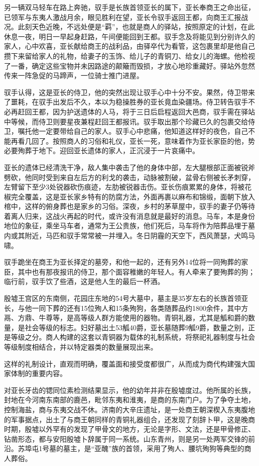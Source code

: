 另一辆双马轻车在路上奔驰，驭手是长族首领亚长的属下，亚长奉商王之命出征，已领军与东夷人激战月余，眼见胜利在望，亚长令驭手返回王都，向商王汇报战况。此刻天色近晚，不远处便是“羁”，也就是商人的驿站，按照原定的计划，在此休息一夜，明日一早起身赶路，午间便能回到王都。驭手念及将能见到分别许久的家人，心中欢喜，亚长献给商王的战利品，由驿卒代为看管，这包裹里却是他自己攒下来留给家人的礼物，给妻子的玉饰、给儿子的青铜刀、给女儿的海螺。他检视了一番，确定这些宝物并未因路途的颠簸而毁损，才放心地珍重藏好。驿站外忽然传来一阵急促的马蹄声，一位骑士推门进屋。

驭手认得，这是亚长的侍卫，他的突然出现让驭手心中十分不安。果然，侍卫带来了噩耗，在驭手出发后不久，本以为稳操胜券的亚长竟血染疆场。侍卫转告驭手不必再赶回王都，因为护送遗体的人马，将于三日后启程返回大邑商，驭手需在驿站中等候，而侍卫则要星夜兼程赶回王都报讯。驭手取出那个珍藏已久的包裹交给侍卫，嘱托他一定要带给自己的家人。驭手心中悲痛，他知道这样好的夜色，自己不能再看几回了。按照商人的习俗和礼仪，亚长一死，意味着作为亚长家臣的他，势必要殉葬于地下。迎回亚长遗体的家人，正沉浸于一片哀痛中。

亚长的遗体已经清洗干净，敌人集中袭击了他的身体中部，左大腿根部正面被锐斧劈砍，他同时受到来自左后方的利戈的袭击，动脉被割破，盆骨右侧被长矛刺穿，左臂留下至少3处锐器砍伤痕迹，左肋被锐器击伤。亚长伤痕累累的身体，将被花椒完全覆盖，这是亚长家乡特有的防腐方法，外面再裹以麻布和锦缎，面朝下放入棺中，这样的俯身葬也是家乡的习俗。深夜，乡村的茅草屋中，驭手的妻子仍等待着离人归来，这战火再起的时代，或许没有消息就是最好的消息。马车，本是身份地位的象征，乘坐马车者，通常为王公贵族，他们死后，马车将作为陪葬品埋于墓内或其附近，马匹和驭手常常被一并埋入。冬日阴霾的天空下，西风萧瑟，犬鸣马啸。

驭手跪坐在商王为亚长择定的墓旁，和他一起的，还有另外14位将一同殉葬的家臣，其中也有那夜报讯的侍卫，那个面容稚嫩的年轻人。有人牵来了要殉葬的狗；临行前，驭手饮了些酒，这是他人生的最后一杯酒。

殷墟王宫区的东南侧，花园庄东地的54号大墓中，墓主是35岁左右的长族首领亚长，与他一同下葬的还有15位殉人和15条殉狗，各类随葬品约1800余件，其中方鬲、方鼎、牛尊等，是高等级人群方能使用的器物。青铜礼器，尤其是觚和爵的数量，是社会等级的标志。妇好墓出土53觚40爵，亚长墓随葬9觚9爵，数量之别，正是等级之分。商人构建的这套以青铜器为载体的礼制系统，将祭祀礼器制度与社会等级制度相结合，并以特定器类的数量展现出来。

这样的礼制设计，直观而明确，覆盖面和接受度都很广，从而成为商代构建强大国家体制的重要内容。

对亚长牙齿的锶同位素检测结果显示，他的幼年并非在殷墟度过。他所属的长族，封地在今河南东南部的鹿邑，毗邻东夷和淮夷，是商的东南门户。为了争夺土地，控制海盐，商与东夷交战不休。济南的大辛庄遗址，是一处商王朝深楔入东夷腹地的军事据点，出土了与商王朝同样的青铜礼器组合，还发现了刻辞卜甲，这是晚商时期，殷墟以外罕有的发现了甲骨文的地方，无论是字形、文法，还是甲骨修正、钻凿形态，都与安阳殷墟卜辞属于同一系统。山东青州，则是另一处两军交锋的前沿。苏埠屯1号墓的墓主，是“亚醜”族的首领，采用了殉人、腰坑殉狗等典型的商人葬俗。

